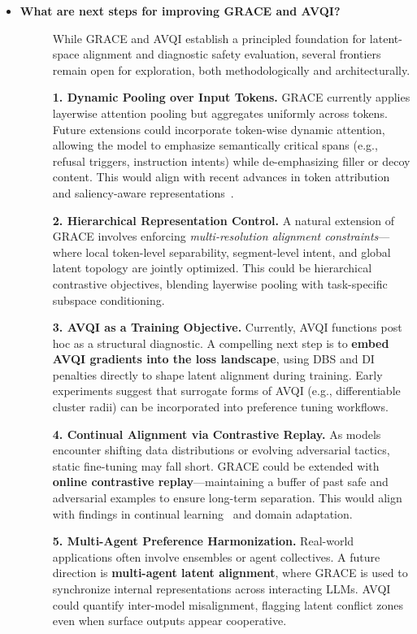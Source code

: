 \begin{itemize}[leftmargin=15pt,nolistsep]
\item[\ding{93}] { \selectfont \textbf{What are next steps for improving GRACE and AVQI?}}
\begin{description}
\item[]
While GRACE and AVQI establish a principled foundation for latent-space alignment and diagnostic safety evaluation, several frontiers remain open for exploration, both methodologically and architecturally.

\textbf{1. Dynamic Pooling over Input Tokens.} GRACE currently applies layerwise attention pooling but aggregates uniformly across tokens. Future extensions could incorporate token-wise dynamic attention, allowing the model to emphasize semantically critical spans (e.g., refusal triggers, instruction intents) while de-emphasizing filler or decoy content. This would align with recent advances in token attribution and saliency-aware representations~\citep{li2021implicit, geva2022transformer}.

\textbf{2. Hierarchical Representation Control.} A natural extension of GRACE involves enforcing \textit{multi-resolution alignment constraints}—where local token-level separability, segment-level intent, and global latent topology are jointly optimized. This could be hierarchical contrastive objectives, blending layerwise pooling with task-specific subspace conditioning.

\textbf{3. AVQI as a Training Objective.} Currently, AVQI functions post hoc as a structural diagnostic. A compelling next step is to \textbf{embed AVQI gradients into the loss landscape}, using DBS and DI penalties directly to shape latent alignment during training. Early experiments suggest that surrogate forms of AVQI (e.g., differentiable cluster radii) can be incorporated into preference tuning workflows.

\textbf{4. Continual Alignment via Contrastive Replay.} As models encounter shifting data distributions or evolving adversarial tactics, static fine-tuning may fall short. GRACE could be extended with \textbf{online contrastive replay}—maintaining a buffer of past safe and adversarial examples to ensure long-term separation. This would align with findings in continual learning~\citep{lopez2017gradient, chaudhry2019tiny} and domain adaptation.

\textbf{5. Multi-Agent Preference Harmonization.} Real-world applications often involve ensembles or agent collectives. A future direction is \textbf{multi-agent latent alignment}, where GRACE is used to synchronize internal representations across interacting LLMs. AVQI could quantify inter-model misalignment, flagging latent conflict zones even when surface outputs appear cooperative.


\end{description}
\end{itemize}
